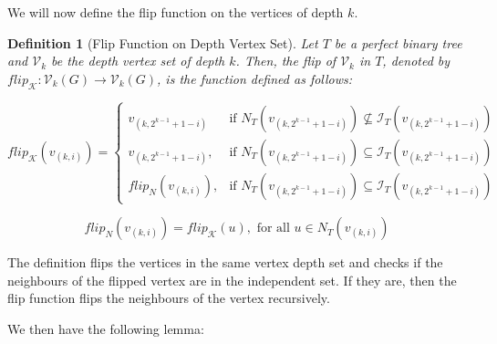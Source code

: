 \documentclass{amsart}
\newtheorem{definition}[theorem]{Definition}
\theoremstyle{definition}
\begin{document}
We will now define the flip function on the vertices of depth $k$.

\begin{definition}[Flip Function on Depth Vertex Set]
  Let $T$ be a perfect binary tree and $\mathcal{V}_k$ be the depth vertex set of depth $k$. Then, the flip of $\mathcal{V}_k$ in $T$, denoted by $flip_\mathcal{K}: \mathcal{V}_k(G) \rightarrow \mathcal{V}_k(G)$, is the function defined as follows:

  \begin{equation*}
    flip_\mathcal{K}(v_{(k, i)}) = \begin{cases}
      v_{(k, 2^{k-1} + 1 - i)}  & \text{if } N_T(v_{(k, 2^{k - 1} + 1 - i)}) \not\subseteq \mathcal{I}_T(v_{(k, 2^{k - 1} + 1 - i)}) \\
      v_{(k, 2^{k-1} + 1 - i)}, & \text{if } N_T(v_{(k, 2^{k - 1} + 1 - i)}) \subseteq \mathcal{I}_T(v_{(k, 2^{k - 1} + 1 - i)})     \\
      flip_N(v_{(k, i)}),       & \text{if } N_T(v_{(k, 2^{k - 1} + 1 - i)}) \subseteq \mathcal{I}_T(v_{(k, 2^{k - 1} + 1 - i)})
    \end{cases}
  \end{equation*}

  \begin{equation*}
    flip_N(v_{(k, i)}) =  flip_\mathcal{K}(u), \text{ for all } u \in N_T(v_{(k, i)})
  \end{equation*}
\end{definition}

The definition flips the vertices in the same vertex depth set and checks if the neighbours of the flipped vertex are in the independent set. If they are, then the flip function flips the neighbours of the vertex recursively.

We then have the following lemma:
\end{document}
